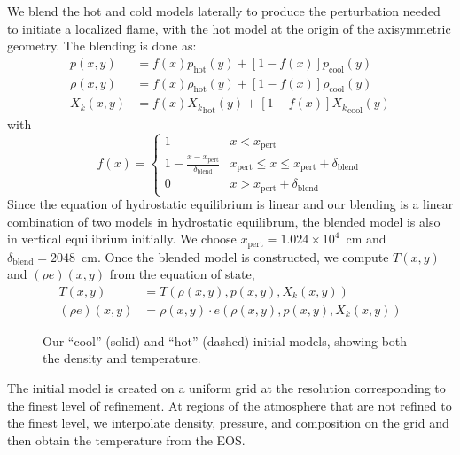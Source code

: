 \documentclass[preprint,times,tighten]{aastex63}
\begin{document}
We blend the hot and cold models laterally to produce the perturbation
needed to initiate a localized flame, with the hot model at the
origin of the axisymmetric geometry.  The blending is done as:
\begin{align}
p(x,y) &= f(x) p_\mathrm{hot}(y) + [1-f(x)] p_\mathrm{cool}(y) \\
\rho(x,y) &= f(x) \rho_\mathrm{hot}(y) + [1-f(x)] \rho_\mathrm{cool}(y) \\
X_k(x,y) &= f(x) {X_k}_\mathrm{hot}(y) + [1-f(x)] {X_k}_\mathrm{cool}(y)
\end{align}
with
\begin{equation}
f(x) = \begin{cases}
     1 & x < x_\mathrm{pert} \\
   1 - \frac{x - x_\mathrm{pert}}{\delta_\mathrm{blend}} & x_\mathrm{pert} \le x \le x_\mathrm{pert} + \delta_\mathrm{blend} \\
     0 & x > x_\mathrm{pert} + \delta_\mathrm{blend}
\end{cases}
\end{equation}
Since the equation of hydrostatic equilibrium is linear and our
blending is a linear combination of two models in hydrostatic
equilibrum, the blended model is also in vertical equilibrium initially.  We choose
$x_\mathrm{pert} = 1.024\times 10^4$~cm and $\delta_\mathrm{blend} = 2048$~cm.  Once
the blended model is constructed, we compute $T(x,y)$ and $(\rho e)(x,y)$
from the equation of state,
\begin{align}
  T(x,y) &= T(\rho(x,y), p(x,y), X_k(x,y)) \\
  (\rho e)(x,y) &= \rho(x, y) \cdot e(\rho(x,y), p(x,y), X_k(x,y)) 
\end{align}

\begin{figure}[t]
\centering
{}
\caption{\label{fig:initial_models} Our ``cool'' (solid) and ``hot''
  (dashed) initial models, showing both the density and temperature.}
\end{figure}

The initial model is created on a uniform grid at the resolution
corresponding to the finest level of refinement.  At regions of the
atmosphere that are not refined to the finest level, we interpolate
density, pressure, and composition on the grid and then obtain the
temperature from the EOS.  


\end{document}
